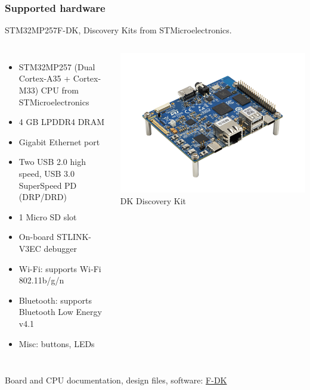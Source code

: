 \begin{frame}
\frametitle{Supported hardware}
  STM32MP257F-DK, Discovery Kits from STMicroelectronics. 
  \footnotesize
  \begin{columns}
    \begin{itemize}
    \item STM32MP257 (Dual Cortex-A35 + Cortex-M33) CPU from STMicroelectronics
    \item 4 GB LPDDR4 DRAM 
    \item Gigabit Ethernet port
    \item Two USB 2.0 high speed, USB 3.0 SuperSpeed PD (DRP/DRD) 
    \item 1 Micro SD slot
    \item On-board STLINK-V3EC debugger
    \item Wi-Fi: supports Wi‑Fi 802.11b/g/n
    \item Bluetooth: supports Bluetooth Low Energy v4.1
    \item Misc: buttons, LEDs

    \end{itemize}
    \begin{center}
    \includegraphics[width=\textwidth]{slides/discovery-board-stm32mp2/STM32MP257F-DK.png}\\
    DK Discovery Kit
    \end{center}
  \end{columns}
  \vspace{0.5em}
  Board and CPU documentation, design files, software:
  \href{https://www.st.com/en/evaluation-tools/stm32mp257f-dk.html}{F-DK}
\end{frame}
